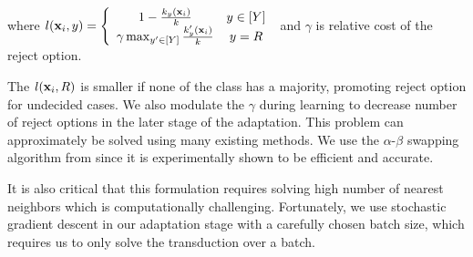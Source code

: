 where $l(\mathbf{x}_i, y) = \left\{ \begin{array}{cc}  1 - \frac{k_y(\mathbf{x}_i)}{k} & y \in [Y] \\ \gamma \max_{y^\prime \in [Y]} \frac{k_y^\prime(\mathbf{x}_i)}{k}
 & y=R \end{array}\right.$ and $\gamma$ is relative cost of the reject option. 
 
The $l(\mathbf{x}_i,R)$ is smaller if none of the class has a majority, promoting reject option for undecided cases. We also modulate the $\gamma$ during learning to decrease number of reject options in the later stage of the adaptation. This problem can approximately be solved using many existing methods. We use the $\alpha$-$\beta$ swapping algorithm from \cite{kolmogrovalphabeta} since it is experimentally shown to be efficient and accurate. %

It is also critical that this formulation requires solving high number of nearest neighbors which is computationally challenging. Fortunately, we use stochastic gradient descent in our adaptation stage with a carefully chosen batch size, which requires us to only solve the transduction over a batch. %

